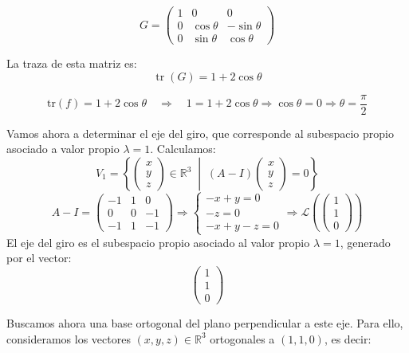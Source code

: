 \documentclass[12pt]{article}
\begin{document}
\begin{ejercicio}[4 puntos]
\begin{enumerate}
			\[
			G =
			\begin{pmatrix}
				1 & 0 & 0 \\
				0 & \cos\theta & -\sin\theta \\
				0 & \sin\theta & \cos\theta
			\end{pmatrix}
			\]
			
			La traza de esta matriz es:
			\[
			\operatorname{tr}(G) = 1 + 2\cos\theta
			\]
			
			\[
			\text{tr}(f) = 1 + 2\cos\theta
			\quad \Rightarrow \quad
			1 = 1 + 2\cos\theta \Rightarrow \cos\theta = 0 \Rightarrow \theta = \dfrac{\pi}{2}
			\]
			
			Vamos ahora a determinar el eje del giro, que corresponde al subespacio propio asociado a valor propio \( \lambda = 1 \). Calculamos:
			\[
			V_1 = \left\lbrace
			\begin{pmatrix}
				x \\
				y \\
				z
			\end{pmatrix}
			\in \mathbb{R}^3 \; \middle| \;
			(A - I)
			\begin{pmatrix}
				x \\
				y \\
				z
			\end{pmatrix}
			= 0
			\right\rbrace
			\]
			\[
			A - I =
			\begin{pmatrix}
				-1 & 1 & 0 \\
				0 & 0 & -1 \\
				-1 & 1 & -1
			\end{pmatrix}
			\Rightarrow
			\left\lbrace
			\begin{array}{l}
				-x + y = 0 \\
				-z = 0 \\
				-x + y - z = 0
			\end{array}
			\right. \Rightarrow
			\mathcal{L}\left( \begin{pmatrix} 1 \\ 1 \\ 0 \end{pmatrix} \right)
			\]
			El eje del giro es el subespacio propio asociado al valor propio \( \lambda = 1 \), generado por el vector:
			\[
			\begin{pmatrix}
				1 \\ 1 \\ 0
			\end{pmatrix}
			\]
			
			Buscamos ahora una base ortogonal del plano perpendicular a este eje. Para ello, consideramos los vectores \( (x, y, z) \in \mathbb{R}^3 \) ortogonales a \( (1, 1, 0) \), es decir:
			

\end{enumerate}
\end{ejercicio}
\end{document}
